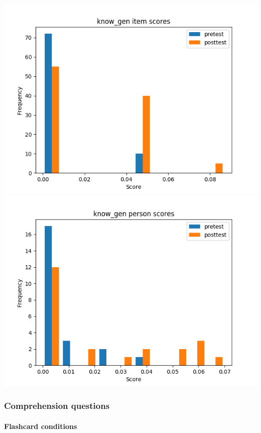 \documentclass[]{article}
\begin{document}
\includegraphics{know_gen_diff.png} \includegraphics{know_gen_abil.png}

\subsubsection{Comprehension questions}\label{comprehension-questions}

\FloatBarrier
\paragraph{Flashcard conditions}\label{flashcard-conditions-4}
\end{document}
